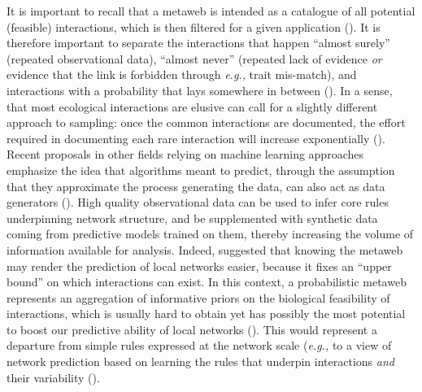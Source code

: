 \begin{refsection}
It is important to recall that a metaweb is intended as a catalogue of
all potential (feasible) interactions, which is then filtered for a
given application (\cite{Morales-Castilla2015Inferring}). It is therefore
important to separate the interactions that happen ``almost surely''
(repeated observational data), ``almost never'' (repeated lack of
evidence \emph{or} evidence that the link is forbidden through
\emph{e.g.,} trait mis-match), and interactions with a probability that
lays somewhere in between (\cite{Catchen2023Missing}). In a sense, that
most ecological interactions are elusive can call for a slightly
different approach to sampling: once the common interactions are
documented, the effort required in documenting each rare interaction
will increase exponentially (\cite{Jordano2016SamNet}). Recent proposals
in other fields relying on machine learning approaches emphasize the
idea that algorithms meant to predict, through the assumption that they
approximate the process generating the data, can also act as data
generators (\cite{Hoffmann2019Machine}). High quality observational data
can be used to infer core rules underpinning network structure, and be
supplemented with synthetic data coming from predictive models trained
on them, thereby increasing the volume of information available for
analysis. Indeed, \cite{Strydom2021Roadmap} suggested that knowing the metaweb
may render the prediction of local networks easier, because it fixes an
``upper bound'' on which interactions can exist. In this context, a
probabilistic metaweb represents an aggregation of informative priors on
the biological feasibility of interactions, which is usually hard to
obtain yet has possibly the most potential to boost our predictive
ability of local networks (\cite{Bartomeus2013Understanding,
Bartomeus2016ComFra}). This would represent a departure from simple
rules expressed at the network scale (\emph{e.g.,} \cite{Williams2000Simple} to
a view of network prediction based on learning the rules that underpin
interactions \emph{and} their variability
(\cite{Gupta2022Simultaneously}).


\end{refsection}
